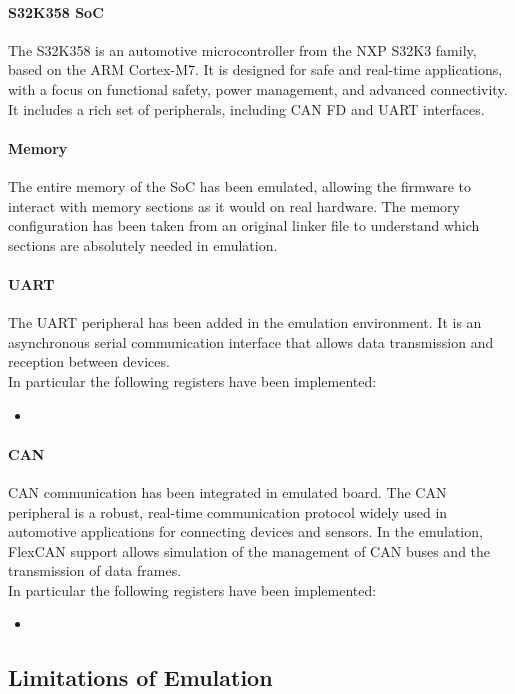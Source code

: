 \paragraph{S32K358 SoC}
The S32K358 is an automotive microcontroller from the NXP S32K3 family, based on the ARM Cortex-M7. It is designed for safe and real-time applications, with a focus on functional safety, power management, and advanced connectivity. It includes a rich set of peripherals, including CAN FD and UART interfaces.

\paragraph{Memory}
The entire memory of the SoC has been emulated, allowing the firmware to interact with memory sections as it would on real hardware. The memory configuration has been taken from an original linker file to understand which sections are absolutely needed in emulation.

\paragraph{UART}
The UART peripheral has been added in the emulation environment. It is an asynchronous serial communication interface that allows data transmission and reception between devices.\\
In particular the following registers have been implemented:
\begin{itemize}
    \item 
\end{itemize}

\paragraph{CAN}
CAN communication has been integrated in emulated board. The CAN peripheral is a robust, real-time communication protocol widely used in automotive applications for connecting devices and sensors. In the emulation, FlexCAN support allows simulation of the management of CAN buses and the transmission of data frames.\\
In particular the following registers have been implemented:
\begin{itemize}
    \item 
\end{itemize}


\subsection{Limitations of Emulation}

